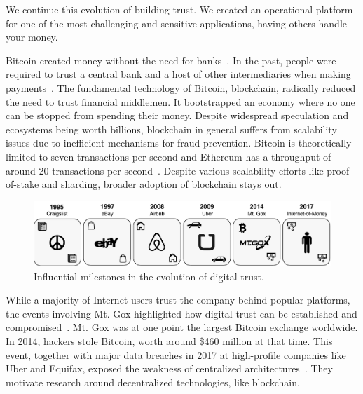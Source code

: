 We continue this evolution of building trust.
We created an operational platform for one of the most challenging and sensitive applications, having others handle your money.

Bitcoin created money without the need for banks~\cite{nakamoto2008bitcoin}.
In the past, people were required to trust a central bank and a host of other intermediaries when making payments~\cite{kokkola2011payment}.
The fundamental technology of Bitcoin, blockchain, radically reduced the need to trust financial middlemen.
It bootstrapped an economy where no one can be stopped from spending their money.
Despite widespread speculation and ecosystems being worth billions, blockchain in general suffers from scalability issues due to inefficient mechanisms for fraud prevention.
Bitcoin is theoretically limited to seven transactions per second and Ethereum has a throughput of around 20 transactions per second~\cite{vukolic2015quest}.
Despite various scalability efforts like proof-of-stake and sharding, broader adoption of blockchain stays out.

\begin{figure}[!t]
	\centering
	\includegraphics[width=\linewidth]{iom/assets/timeline}
	\caption{Influential milestones in the evolution of digital trust.}
	\label{fig:trust_evolution}
\end{figure}

While a majority of Internet users trust the company behind popular platforms, the events involving Mt. Gox highlighted how digital trust can be established and compromised~\cite{mcmillan2014inside}.
Mt. Gox was at one point the largest Bitcoin exchange worldwide.
In 2014, hackers stole Bitcoin, worth around \$460 million at that time. %
This event, together with major data breaches in 2017 at high-profile companies like Uber and Equifax, exposed the weakness of centralized architectures~\cite{uber2017hack}.
They motivate research around decentralized technologies, like blockchain. %

